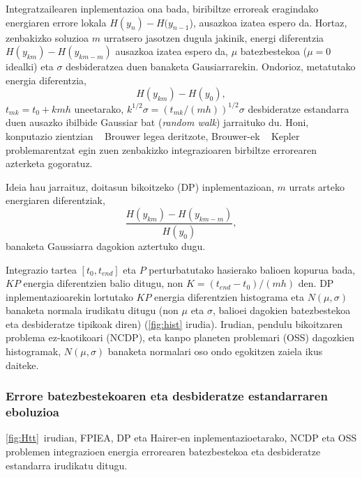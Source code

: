 Integratzailearen inplementazioa ona bada, biribiltze erroreak eragindako energiaren errore lokala $H(y_n)-H(y_{n-1}$), ausazkoa izatea espero da. Hortaz, zenbakizko soluzioa $m$ urratsero jasotzen dugula jakinik, energi diferentzia $H(y_{km})-H(y_{km-m})$ ausazkoa izatea espero da, $\mu$ batezbestekoa ($\mu=0$ idealki) eta $\sigma$ desbideratzea duen banaketa Gausiarrarekin. Ondorioz, metatutako energia diferentzia,
\begin{equation*}
H(y_{km})-H(y_0),
\end{equation*} 
$t_{mk}=t_0+kmh$ uneetarako, $k^{1/2} \sigma=(t_{mk}/(mh))^{1/2} \sigma$ desbideratze estandarra duen ausazko ibilbide Gaussiar bat (\emph{random walk}) jarraituko du. Honi, konputazio zientzian ~\cite{Grazier2005} Brouwer legea deritzote, Brouwer-ek ~\cite{Brouwer1937} Kepler problemarentzat  egin zuen zenbakizko integrazioaren birbiltze errorearen azterketa gogoratuz.

Ideia hau jarraituz, doitasun bikoitzeko (DP) inplementazioan, $m$ urrats arteko energiaren diferentziak,
\begin{equation*}
\frac{H(y_{km})-H(y_{km-m})}{H(y_0)},
\end{equation*} 
banaketa Gaussiarra dagokion aztertuko dugu.   

Integrazio tartea $[t_0, t_{end}]$  eta $P$ perturbatutako hasierako balioen kopurua bada, $KP$ energia diferentzien balio ditugu,
non $K=(t_{end}-t_0)/(mh)$ den. DP inplementazioarekin lortutako $KP$ energia diferentzien histograma eta $N(\mu,\sigma)$ banaketa normala irudikatu ditugu (non $\mu$ eta $\sigma$, balioei dagokien batezbestekoa eta desbideratze tipikoak diren) (\ref{fig:hist} irudia). Irudian, pendulu bikoitzaren problema ez-kaotikoari (NCDP), eta kanpo planeten problemari (OSS) dagozkien histogramak, $N(\mu,\sigma)$ banaketa normalari oso ondo egokitzen zaiela ikus daiteke.


\subsubsection*{Errore batezbestekoaren eta desbideratze estandarraren eboluzioa}


\ref{fig:Htt}~irudian, FPIEA, DP eta Hairer-en inplementazioetarako, NCDP eta OSS problemen integrazioen energia errorearen batezbestekoa eta desbideratze estandarra irudikatu ditugu.

